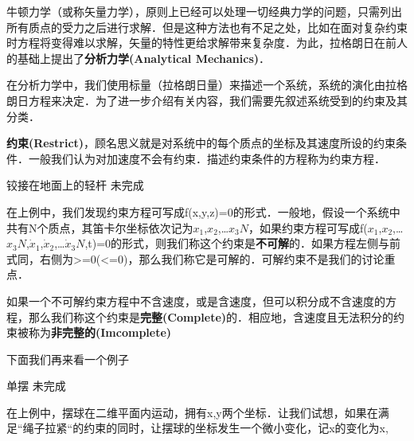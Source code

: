 
\begin{issues}
\issueDraft
\issueTODO
\end{issues}


牛顿力学（或称矢量力学），原则上已经可以处理一切经典力学的问题，只需列出所有质点的受力之后进行求解．但是这种方法也有不足之处，比如在面对复杂约束时方程将变得难以求解，矢量的特性更给求解带来复杂度．为此，拉格朗日在前人的基础上提出了\textbf{分析力学(Analytical Mechanics)}．

在分析力学中，我们使用标量（拉格朗日量）来描述一个系统，系统的演化由拉格朗日方程来决定．为了进一步介绍有关内容，我们需要先叙述系统受到的约束及其分类．

\textbf{约束(Restrict)}，顾名思义就是对系统中的每个质点的坐标及其速度所设的约束条件．一般我们认为对加速度不会有约束．描述约束条件的方程称为约束方程．

\begin{example}{铰接在地面上的轻杆}
未完成
\end{example}

在上例中，我们发现约束方程可写成f(x,y,z)=0的形式．一般地，假设一个系统中共有N个质点，其笛卡尔坐标依次记为$x
_1$,$x_2$,…$x_3N$，如果约束方程可写成f($x_1$,$x_2$,…$x_3N$,$\dot x_1$,$\dot x_2$,…$\dot x_3N$,t)=0的形式，则我们称这个约束是\textbf{不可解}的．如果方程左侧与前式同，右侧为>=0(<=0)，那么我们称它是可解的．可解约束不是我们的讨论重点．

如果一个不可解约束方程中不含速度，或是含速度，但可以积分成不含速度的方程，那么我们称这个约束是\textbf{完整(Complete)}的．相应地，含速度且无法积分的约束被称为\textbf{非完整的(Imcomplete)}

下面我们再来看一个例子

\begin{example}{单摆}
未完成
\end{example}

在上例中，摆球在二维平面内运动，拥有x,y两个坐标．让我们试想，如果在满足“绳子拉紧“的约束的同时，让摆球的坐标发生一个微小变化，记x的变化为\delta x,